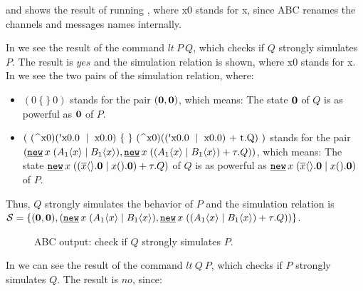  and  shows the result of running , where x0 stands for x, since ABC renames the channels and messages names internally.

In  we see the result of the command $lt\ P\ Q$, which checks if $Q$ strongly simulates $P$. The result is $yes$ and the simulation relation is shown, where x0 stands for x. In  we see the two pairs of the simulation relation, where:
\begin{itemize}
\item $(0\ \{\ \}\ 0)$ stands for the pair $(\mathbf{0},\mathbf{0})$, which means: The state $\mathbf{0}$ of $Q$ is as powerful as  $\mathbf{0}$ of $P$.
\item $(\ (\ \widehat{}\ \text{x0})(\text{\textquotesingle x0.0}\ \mid\ \text{x0.0})\ \{\ \}\ (\ \widehat{}\ \text{x0})((\text{\textquotesingle x0.0}\ \mid\ \text{x0.0}) \text{ + t.Q} )\ )$ stands for the pair $(\procres{x}{(\procpar{\proccall{A_1}{x}}{\proccall{B_1}{x}})},\procres{x}{(\procchoice{(\procpar{\proccall{A_1}{x}}{\proccall{B_1}{x}})}{\tau.Q})})$, which means: The state $\procres{x}{(\procchoice{(\procpar{\out{x}{}.\proczero}{\inp{x}{}.\proczero})}{\tau.Q})}$ of $Q$ is as powerful as  $\procres{x}{(\procpar{\out{x}{}.\proczero}{\inp{x}{}.\proczero})}$ of $P$.

\end{itemize}

Thus, $Q$ strongly simulates the behavior of $P$ and the simulation relation is $\mathcal{S} = \set{(\proczero,\proczero),(\procres{x}{(\procpar{\proccall{A_1}{x}}{\proccall{B_1}{x}})},\procres{x}{(\procchoice{(\procpar{\proccall{A_1}{x}}{\proccall{B_1}{x}})}{\tau.Q})})}$.
\begin{figure}[H]

\caption{ABC output: check if $Q$ strongly simulates $P$.}
\label{pi_simulation_ABC_outputPsQ}
\end{figure}
In  we can see the result of the command $lt\ Q\ P$, which checks if $P$ strongly simulates $Q$. The result is $no$, since:

